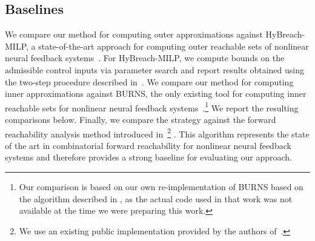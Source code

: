 \documentclass[letterpaper, 10 pt, conference]{ieeeconf}  %
\begin{document}
\subsection{Baselines}
We compare our method for computing outer approximations against HyBreach-MILP, a state-of-the-art approach for computing outer reachable sets of nonlinear neural feedback systems~\cite{rober2023backward}. For HyBreach-MILP, we compute bounds on the admissible control inputs via parameter search and report results obtained using the two-step procedure described in~\cite{rober2023backward}.
We compare our method for computing inner approximations against BURNS, the only existing tool for computing inner reachable sets for nonlinear neural feedback systems~\cite{sidrane2025burns}.\footnote{Our comparison is based on our own re-implementation of BURNS based on the algorithm described in \cite{sidrane2025burns}, as the actual code used in that work was not available at the time we were preparing this work.}  We report the resulting comparisons below.
Finally, we compare the \fab strategy against the forward reachability analysis method introduced in~\cite{akinwande2025verifying}\footnote{We use an existing public implementation provided by the authors of~\cite{akinwande2025verifying}.}
. This algorithm represents the state of the art in combinatorial forward reachability for nonlinear neural feedback systems and therefore provides a strong baseline for evaluating our approach.
\end{document}
